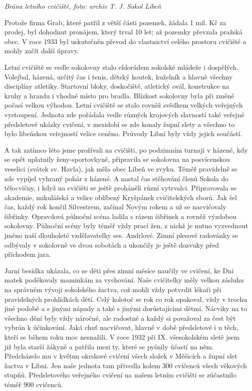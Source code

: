 \emph{Brána letního cvičiště, foto: archiv T. J. Sokol Libeň}

Protože firma Grab, které patřil z větší části pozemek, žádala 1 mil. Kč
za prodej, byl dohodnut pronájem, který trval 10 let; až pozemky
převzala pražská obec. V roce 1933 byl uskutečněn převod do vlastnictví
celého prostoru cvičiště a mohly začít další úpravy.

Letní cvičiště se vedle sokolovny stalo eldorádem sokolské mládeže i
dospělých. Volejbal, házená, určitý čas i tenis, dětský koutek, kuželník
a hlavně všechny disciplíny atletiky. Startovní bloky, doskočiště,
atletický ovál, konstrukce na kruhy a hrazdu i vhodné místo pro bradla.
Blízkost sokolovny byla při změně počasí velkou výhodou. Letní cvičiště
se stalo rovněž svědkem velkých veřejných vystoupení. Jednota zde
pořádala vedle různých krojových slavností také veřejné předsletové
ukázky cvičení, v mezidobí se zde konaly župní slety a všechno to bylo
libeňskou veřejností velice ceněno. Průvody Libní byly vždy jejich
součástí.

A tak zatímco léto jsme prožívali na cvičišti, po podzimním turnaji v
házené, kdy se opět uplatnily ženy-sportovkyně, připravila se sokolovna
na posvícenskou veselici (svátek sv. Havla), jak měla obec Libeň ve
zvyku. Téměř pravidelně se zde vypíjel vyhraný pohár z házené. A nastal
čas stěhování členů Sokola do tělocvičny, i když na cvičišti se ještě
proháněli různí vytrvalci. Připravovala se akademie, mikulášská a velice
oblíbený Kryšpánek cvičitelských sborů. Jak šel čas, každý rok končil
Silvestrem, začínal Novým rokem a už se nacvičovaly šibřinky. Opravdová
půlnoční scéna ladila s rázem šibřinek a rovněž výzdobou sokolovny.
Půlnoční scény byly téměř vždy prací žen, z nichž je nutno vyzvednout
jméno naší dlouholeté vzdělavatelky ses. Andrlové. Zimní plesové
radovánky se odbývaly v sokolovně ve dvou sobotách a ukončily je ještě
dozvuky před příchodem jara.

Jarní besídka ukázala, co se děti přes zimní měsíce naučily ve cvičení,
ke Dni matek poděkovaly maminkám za vychování. Naše cvičitelky měly
velkou zásluhu na správném vývoji sokolského žactva, což mohli vždy
potvrdit lékaři při pravidelných prohlídkách dětí. Celý kolotoč se rok
co rok opakoval, vždy v trochu jiné podobě a s jinými nápady a také s
jinými dorůstajícími dětmi. Nácviky na to všechno dění byly vždy
náročné, ale radostné a každý si považoval za čest být vybrán k
účinkování. Jaká chuť nacvičovat, hlavně v době předsletové i u těch,
kteří se během roku moc nesnažili. V roce 1932 při IX. všesokolském
sletě jsem již byla starší žákyně a patřila mezi ty, které se pyšnily
účastí na něm. Předcházelo mu v květnu okrskové cvičení všech složek v
Měšicích a župní slet žactva v Libni. Jen naše jednota tam přivedla
kolem 300 cvičenců všech věkových stupňů. Předsletového veřejného
cvičení na našem letním cvičišti se zúčastnilo téměř 900 cvičenců.


